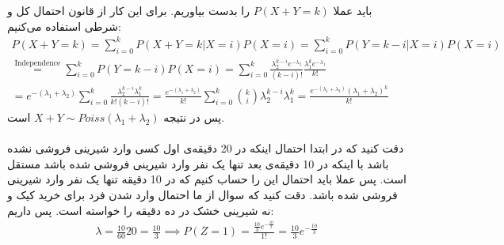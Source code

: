 \\
\\
باید عملا
$P(X + Y = k)$
را بدست بیاوریم. برای این کار از قانون احتمال کل و شرطی استفاده می‌کنیم:
\begin{gather*}
    P(X + Y = k) = \sum_{i=0}^k P(X + Y = k | X = i) P(X = i) = \sum_{i=0}^k P(Y = k - i | X = i) P(X = i)\\
    \stackrel{\text{Independence}}{=} \sum_{i=0}^k P(Y = k - i) P(X = i) = \sum_{i=0}^k \frac{\lambda_2^{k-i} e^{-\lambda_2}}{(k-i)!} \frac{\lambda_1^k e^{-\lambda_1}}{k!} \\
    = e^{-(\lambda_1 + \lambda_2)} \sum_{i=0}^k \frac{\lambda_2^{k-i} \lambda_1^k}{k!(k-i)!} = \frac{e^{-(\lambda_1 + \lambda_2)}}{k!} \sum_{i=0}^k {k \choose i} \lambda_2^{k-i} \lambda_1^k
    = \frac{e^{-(\lambda_1 + \lambda_2)} (\lambda_1 + \lambda_2)^k}{k!}
\end{gather*}
پس در نتیجه
$X + Y \sim Poiss(\lambda_1 + \lambda_2)$
است.
\\\\
دقت کنید که در ابتدا احتمال اینکه در 20 دقیقه‌ی اول کسی وارد شیرینی فروشی نشده باشد با اینکه در 10 دقیقه‌ی
بعد تنها یک نفر وارد شیرینی فروشی شده باشد مستقل است. پس عملا باید احتمال این را حساب کنیم که در 10 دقیقه
تنها یک نفر وارد شیرینی فروشی شده باشد. دقت کنید که سوال از ما احتمال وارد شدن فرد برای خرید کیک و نه
شیرینی خشک در ده دقیقه را خواسته است. پس داریم:
\begin{gather*}
    \lambda = \frac{10}{60}20 = \frac{10}{3} \implies P(Z = 1) = \frac{\frac{10}{3} e^{-\frac{10}{3}}}{1!} = \frac{10}{3} e^{-\frac{10}{3}}
\end{gather*}